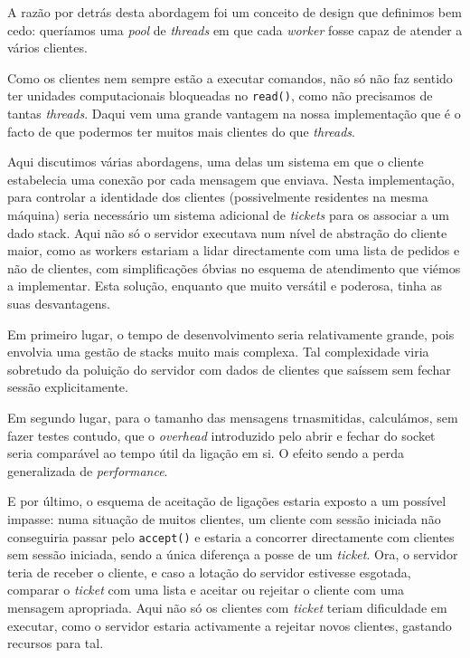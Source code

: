 	A razão por detrás desta abordagem foi um conceito de design que definimos bem cedo: queríamos uma \emph{pool} de \emph{threads} em que cada \emph{worker} fosse capaz de atender a vários clientes.

	Como os clientes nem sempre estão a executar comandos, não só não faz sentido ter unidades computacionais bloqueadas no \verb|read()|, como não precisamos de tantas \emph{threads}.
	Daqui vem uma grande vantagem na nossa implementação que é o facto de que podermos ter muitos mais clientes do que \emph{threads}.
		
	Aqui discutimos várias abordagens, uma delas um sistema em que o cliente estabelecia uma conexão por cada mensagem que enviava.
	Nesta implementação, para controlar a identidade dos clientes (possivelmente residentes na mesma máquina) seria necessário um sistema adicional de \emph{tickets} para os associar a um dado stack.
	Aqui não só o servidor executava num nível de abstração do cliente maior, como as workers estariam a lidar directamente com uma lista de pedidos e não de clientes, com simplificações óbvias no esquema de atendimento que viémos a implementar.
	Esta solução, enquanto que muito versátil e poderosa, tinha as suas desvantagens.
			
	Em primeiro lugar, o tempo de desenvolvimento seria relativamente grande, pois envolvia uma gestão de stacks muito mais complexa.
	Tal complexidade viria sobretudo da poluição do servidor com dados de clientes que saíssem sem fechar sessão explicitamente.
	
	Em segundo lugar, para o tamanho das mensagens trnasmitidas, calculámos, sem fazer testes contudo, que o \emph{overhead} introduzido pelo abrir e fechar do socket seria comparável ao tempo útil da ligação em si.
	O efeito sendo a perda generalizada de \emph{performance}.
	
	E por último, o esquema de aceitação de ligações estaria exposto a um possível impasse: numa situação de muitos clientes, um cliente com sessão iniciada não conseguiria passar pelo \verb|accept()| e estaria a concorrer directamente com clientes sem sessão iniciada, sendo a única diferença a posse de um \emph{ticket}.
	Ora, o servidor teria de receber o cliente, e caso a lotação do servidor estivesse esgotada, comparar o \emph{ticket} com uma lista e aceitar ou rejeitar o cliente com uma mensagem apropriada.
	Aqui não só os clientes com \emph{ticket} teriam dificuldade em executar, como o servidor estaria activamente a rejeitar novos clientes, gastando recursos para tal.
	
